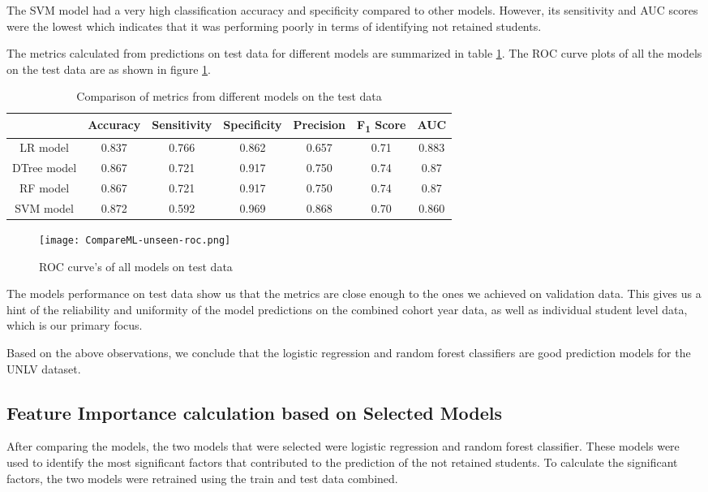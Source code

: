 \documentclass[11pt,openright]{report}
\begin{document}
The SVM model had a very high classification accuracy and specificity compared to other models. However, its sensitivity and AUC scores were the lowest which indicates that it was performing poorly in terms of identifying not retained students. 

The metrics calculated from predictions on test data for different models are summarized in table \ref{table:compare_models_unseen_db}. The ROC curve plots of all the models on the test data are as shown in figure \ref{fig:comparison_test_roc}.


\begin{table}[!htb]
	\renewcommand{\arraystretch}{1.3}
	\caption{Comparison of metrics from different models on the test data}
	\label{table:compare_models_unseen_db}
	\centering
	\begin{tabular}{|c|c|c|c|c|c|c|}
    \hline
  	 & \bfseries Accuracy & \bfseries Sensitivity & \bfseries Specificity & \bfseries Precision & \bfseries F\textsubscript{1} Score  & \bfseries AUC\\  
    \hline
        LR model & 0.837 & 0.766 & 0.862 & 0.657 & 0.71 & 0.883 \\ \hline
        DTree model & 0.867 & 0.721 & 0.917 & 0.750 & 0.74 & 0.87 \\ \hline
        RF model & 0.867 & 0.721 & 0.917 & 0.750 & 0.74 & 0.87 \\ \hline
        SVM model & 0.872 & 0.592 & 0.969 & 0.868 & 0.70 & 0.860 \\ \hline
	\end{tabular} 
\end{table}


 \begin{figure}[!htb]
	\centering
	\texttt{[image: CompareML-unseen-roc.png]}
	\caption{ROC curve's of all models on test data}
	\label{fig:comparison_test_roc}
\end{figure} 

The models performance on test data show us that the metrics are close enough to the ones we achieved on validation data. This gives us a hint of the reliability and uniformity of the model predictions on the combined cohort year data, as well as individual student level data, which is our primary focus.

Based on the above observations, we conclude that the logistic regression and random forest classifiers are good prediction models for the UNLV dataset.



\subsection{Feature Importance calculation based on Selected Models} 
After comparing the models, the two models that were selected were logistic regression and random forest classifier. These models were used to identify the most significant factors that contributed to the prediction of the not retained students. To calculate the significant factors, the two models were retrained using the train and test data combined.
\end{document}
